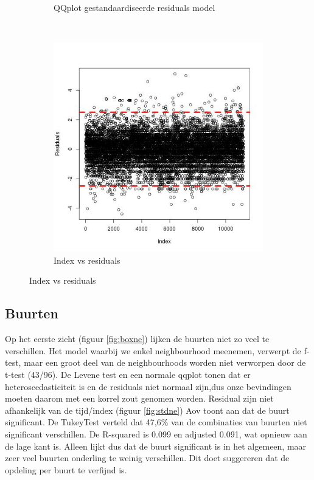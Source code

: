 \documentclass[a4paper,kulak]{kulakarticle} %
\begin{document}
\begin{figure}[H]
\begin{subfigure}[b]{0.3\textwidth}
		\caption{QQplot gestandaardiseerde residuals model}
		\label{fig:qqboxcit}
	\end{subfigure}
	~
	\begin{subfigure}[b]{0.3\textwidth}
		\includegraphics[width=\textwidth]{indc.jpg}
		\caption{Index vs residuals}
		\label{fig:indc}
	\end{subfigure}
\end{figure}

\subsection{Buurten}
Op het eerste zicht (figuur \ref{fig:boxne}) lijken de buurten niet zo veel te verschillen.
Het model waarbij we enkel neighbourhood meenemen, verwerpt de f-test, maar een groot deel van de neighbourhoods worden niet verworpen door de t-test (43/96). 
De Levene test en een normale qqplot tonen dat er heteroscedasticiteit is en de residuals niet normaal zijn,dus onze bevindingen moeten daarom met een korrel zout genomen worden.
Residual zijn niet afhankelijk van de tijd/index (figuur \ref{fig:stdne})
Aov toont aan dat de buurt significant.
De TukeyTest verteld dat 47,6\% van de combinaties van buurten  niet significant verschillen.
De R-squared is 0.099 en adjusted 0.091, wat opnieuw aan de lage kant is.
Alleen lijkt dus dat de buurt significant is in het algemeen, maar zeer veel buurten onderling te weinig verschillen.
Dit doet suggereren dat de opdeling per buurt te verfijnd is.
\end{document}
